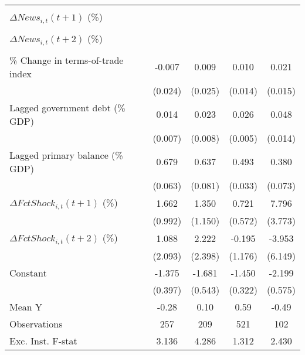 {\begin{tabular}{l*{4}{c}}
                    &                     &                     &                     &                     \\
\addlinespace
$ \Delta News_{i,t}(t+1)$ (\%)&                     &                     &                     &                     \\
                    &                     &                     &                     &                     \\
\addlinespace
$ \Delta News_{i,t}(t+2)$ (\%)&                     &                     &                     &                     \\
                    &                     &                     &                     &                     \\
\addlinespace
\% Change in terms-of-trade index&      -0.007         &       0.009         &       0.010         &       0.021         \\
                    &     (0.024)         &     (0.025)         &     (0.014)         &     (0.015)         \\
\addlinespace
Lagged government debt (\% GDP)&       0.014\sym{*}  &       0.023\sym{**} &       0.026\sym{***}&       0.048\sym{***}\\
                    &     (0.007)         &     (0.008)         &     (0.005)         &     (0.014)         \\
\addlinespace
Lagged primary balance (\% GDP)&       0.679\sym{***}&       0.637\sym{***}&       0.493\sym{***}&       0.380\sym{***}\\
                    &     (0.063)         &     (0.081)         &     (0.033)         &     (0.073)         \\
\addlinespace
$ \Delta FctShock_{i,t}(t+1)$ (\%)&       1.662         &       1.350         &       0.721         &       7.796\sym{*}  \\
                    &     (0.992)         &     (1.150)         &     (0.572)         &     (3.773)         \\
\addlinespace
$ \Delta FctShock_{i,t}(t+2)$ (\%)&       1.088         &       2.222         &      -0.195         &      -3.953         \\
                    &     (2.093)         &     (2.398)         &     (1.176)         &     (6.149)         \\
\addlinespace
Constant            &      -1.375\sym{***}&      -1.681\sym{**} &      -1.450\sym{***}&      -2.199\sym{***}\\
                    &     (0.397)         &     (0.543)         &     (0.322)         &     (0.575)         \\
\midrule
Mean Y              &       -0.28         &        0.10         &        0.59         &       -0.49         \\
Observations        &         257         &         209         &         521         &         102         \\
Exc. Inst. F-stat   &       3.136         &       4.286         &       1.312         &       2.430         \\
\bottomrule
\end{tabular}
}
